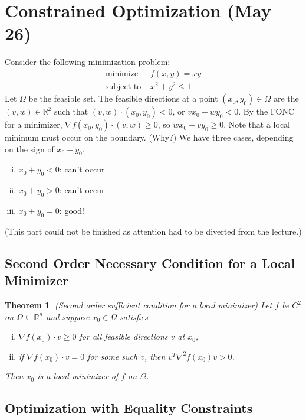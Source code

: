 \documentclass[11pt]{article}
\newcommand{\R}{\mathbb{R}}
\newtheorem{theorem}{Theorem}[subsection]
\begin{document}
\newpage
\section{Constrained Optimization (May 26)}

Consider the following minimization problem:
\begin{align*}
\text{minimize } &f(x,y) = xy \\
\text{subject to } &x^2 + y^2 \leq 1
\end{align*}
Let $\Omega$ be the feasible set. The feasible directions at a point $(x_0, y_0) \in \Omega$ are the $(v, w) \in \R^2$ such that $(v, w) \cdot (x_0, y_0) < 0$, or $vx_0 + wy_0 < 0$. By the FONC for a minimizer, $\nabla f(x_0, y_0) \cdot (v, w) \geq 0$, so $wx_0 + vy_0 \geq 0$. Note that a local minimum must occur on the boundary. (Why?) We have three cases, depending on the sign of $x_0 + y_0$.
\begin{enumerate}[(i)]
\item $x_0 + y_0 < 0$: can't occur
\item $x_0 + y_0 > 0$: can't occur
\item $x_0 + y_0 = 0$: good!
\end{enumerate}
(This part could not be finished as attention had to be diverted from the lecture.)

\subsection{Second Order Necessary Condition for a Local Minimizer}

\begin{theorem}
(Second order sufficient condition for a local minimizer) Let $f$ be $C^2$ on $\Omega \subseteq \R^n$ and suppose $x_0 \in \Omega$ satisfies
\begin{enumerate}[(i)]
\item $\nabla f(x_0) \cdot v \geq 0$ for all feasible directions $v$ at $x_0$,
\item if $\nabla f(x_0) \cdot v = 0$ for some such $v$, then $v^T \nabla^2 f(x_0) v > 0$.
\end{enumerate}
Then $x_0$ is a local minimizer of $f$ on $\Omega$.
\end{theorem}

\subsection{Optimization with Equality Constraints}
\end{document}
